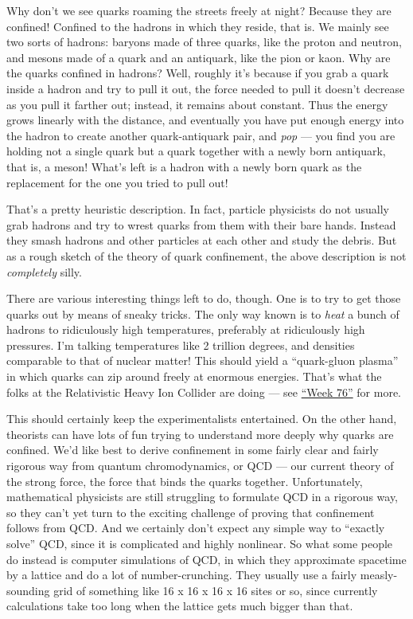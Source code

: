 \documentclass{article}
\begin{document}
Why don't we see quarks roaming the streets freely at night? Because
they are confined! Confined to the hadrons in which they reside, that
is. We mainly see two sorts of hadrons: baryons made of three quarks,
like the proton and neutron, and mesons made of a quark and an
antiquark, like the pion or kaon. Why are the quarks confined in
hadrons? Well, roughly it's because if you grab a quark inside a hadron
and try to pull it out, the force needed to pull it doesn't decrease as
you pull it farther out; instead, it remains about constant. Thus the
energy grows linearly with the distance, and eventually you have put
enough energy into the hadron to create another quark-antiquark pair,
and \emph{pop} --- you find you are holding not a single quark but a
quark together with a newly born antiquark, that is, a meson! What's
left is a hadron with a newly born quark as the replacement for the one
you tried to pull out!

That's a pretty heuristic description. In fact, particle physicists do
not usually grab hadrons and try to wrest quarks from them with their
bare hands. Instead they smash hadrons and other particles at each other
and study the debris. But as a rough sketch of the theory of quark
confinement, the above description is not \emph{completely} silly.

There are various interesting things left to do, though. One is to try
to get those quarks out by means of sneaky tricks. The only way known is
to \emph{heat} a bunch of hadrons to ridiculously high temperatures,
preferably at ridiculously high pressures. I'm talking temperatures like
2 trillion degrees, and densities comparable to that of nuclear matter!
This should yield a ``quark-gluon plasma'' in which quarks can zip
around freely at enormous energies. That's what the folks at the
Relativistic Heavy Ion Collider are doing --- see
\protect\hyperlink{week76}{``Week 76''} for more.

This should certainly keep the experimentalists entertained. On the
other hand, theorists can have lots of fun trying to understand more
deeply why quarks are confined. We'd like best to derive confinement in
some fairly clear and fairly rigorous way from quantum chromodynamics,
or QCD --- our current theory of the strong force, the force that binds
the quarks together. Unfortunately, mathematical physicists are still
struggling to formulate QCD in a rigorous way, so they can't yet turn to
the exciting challenge of proving that confinement follows from QCD. And
we certainly don't expect any simple way to ``exactly solve'' QCD, since
it is complicated and highly nonlinear. So what some people do instead
is computer simulations of QCD, in which they approximate spacetime by a
lattice and do a lot of number-crunching. They usually use a fairly
measly-sounding grid of something like 16 x 16 x 16 x 16 sites or so,
since currently calculations take too long when the lattice gets much
bigger than that.
\end{document}

